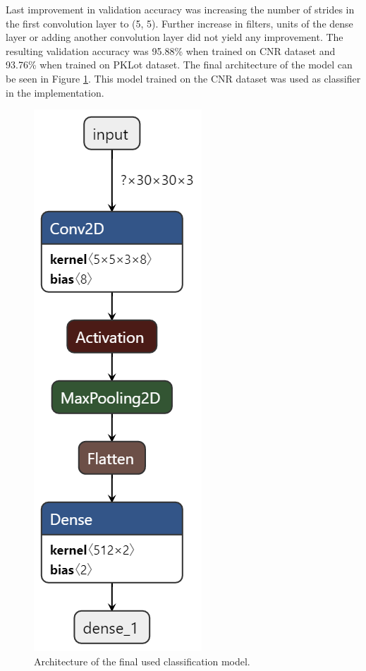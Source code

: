 \documentclass[thesis=M,english]{FITthesis}[2019/03/06]
\begin{document}
Last improvement in validation accuracy was increasing the number of strides in the first convolution layer to (5, 5). Further increase in filters, units of the dense layer or adding another convolution layer did not yield any improvement. The resulting validation accuracy was 95.88\% when trained on CNR dataset and 93.76\% when trained on PKLot dataset. The final architecture of the model can be seen in Figure \ref{label:reduced_mode_finall}. This model trained on the CNR dataset was used as classifier in the implementation.\\






\begin{figure}[ht!]
	\centering
	\includegraphics[scale=0.3]{imgs/reduced-model-final.png}
	\caption{Architecture of the final used classification model.}
	\label{label:reduced_mode_finall}
\end{figure}
\end{document}
